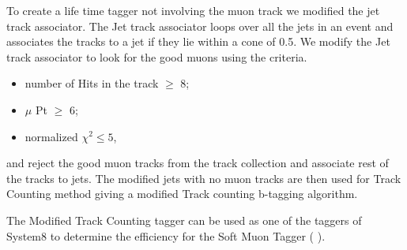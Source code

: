 To create a life time tagger not involving the muon track we modified 
the jet track associator. The Jet track associator  loops over all the jets 
in an event and associates the tracks to a jet if they lie within a cone of 
0.5. We modify the Jet track associator to look for the good muons using the
criteria.
\begin{itemize} 
\item   number of Hits in the track $ \ge $ 8;
\item   $\mu $ Pt $ \ge $ 6;
\item   normalized $\chi^{2} \le 5$,
\end{itemize}   
and reject the good muon tracks from the track collection and associate rest 
of the tracks to jets. The modified jets with no muon tracks are then used 
for Track Counting method giving a modified Track counting b-tagging algorithm.

The Modified Track Counting tagger can be used as one of the taggers of System8 
to determine the efficiency for the Soft Muon Tagger ( \ptrel).


